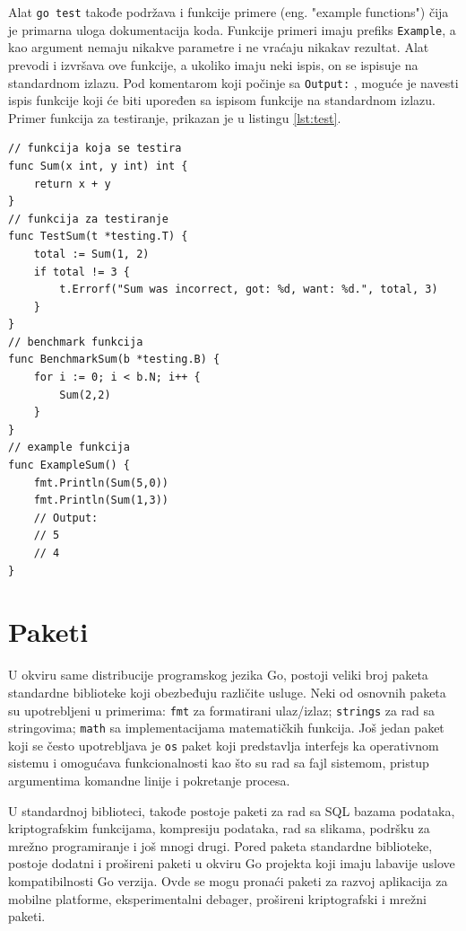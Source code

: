 \documentclass[12pt,oneside]{memoir}
\begin{document}
Alat \texttt{go test} takođe podržava i funkcije primere (eng. "example functions") čija je primarna uloga dokumentacija koda. Funkcije primeri imaju prefiks  \texttt{Example}, a kao argument nemaju nikakve parametre i ne vraćaju nikakav rezultat. Alat prevodi i izvršava ove funkcije, a ukoliko imaju neki ispis, on se ispisuje na standardnom izlazu. Pod komentarom koji počinje sa \texttt{Output:} , moguće je navesti ispis funkcije koji će biti upoređen sa ispisom funkcije na standardnom izlazu. Primer funkcija za testiranje, prikazan je u listingu \ref{lst:test}.

\begin{center}
\begin{lstlisting}[caption=Primer različitih tipova funkcija za testiranje, label={lst:test},  backgroundcolor=\color{background}]
// funkcija koja se testira
func Sum(x int, y int) int {  
	return x + y
}
// funkcija za testiranje
func TestSum(t *testing.T) {  
	total := Sum(1, 2)
	if total != 3 {
		t.Errorf("Sum was incorrect, got: %d, want: %d.", total, 3)
	}
}
// benchmark funkcija
func BenchmarkSum(b *testing.B) {
	for i := 0; i < b.N; i++ {
		Sum(2,2)
	}
}
// example funkcija
func ExampleSum() {
	fmt.Println(Sum(5,0))
	fmt.Println(Sum(1,3))
	// Output:
	// 5
	// 4
}

\end{lstlisting}
\end{center}

\section{Paketi}

U okviru same distribucije programskog jezika Go, postoji veliki broj paketa standardne biblioteke koji obezbeđuju različite usluge. Neki od osnovnih paketa su upotrebljeni u primerima: \texttt{fmt} za formatirani ulaz/izlaz; \texttt{strings} za rad sa stringovima; \texttt{math} sa implementacijama matematičkih funkcija. Još jedan paket koji se često upotrebljava je \texttt{os} paket koji predstavlja interfejs ka operativnom sistemu i omogućava funkcionalnosti kao što su rad sa fajl sistemom, pristup argumentima komandne linije i pokretanje procesa.

U standardnoj biblioteci, takođe postoje paketi za rad sa SQL bazama podataka, kriptografskim funkcijama, kompresiju podataka, rad sa slikama,  podršku za mrežno programiranje i još mnogi drugi. Pored paketa standardne biblioteke, postoje dodatni i prošireni paketi u okviru Go projekta koji imaju labavije uslove kompatibilnosti Go verzija. Ovde se mogu pronaći paketi za razvoj aplikacija za mobilne platforme, eksperimentalni debager, prošireni kriptografski i mrežni paketi. 
\end{document}
